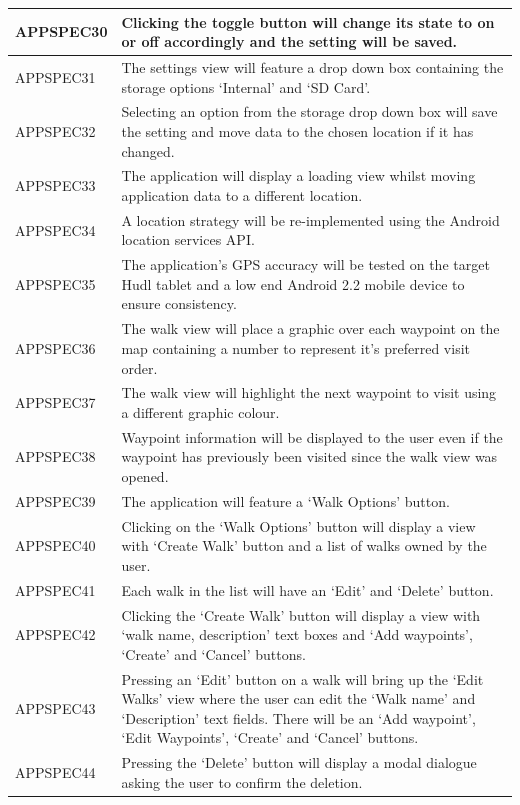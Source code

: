 \documentclass[11pt,a4paper]{article}
\begin{document}
\begin{longtable}{|p{2.5cm}p{13cm}|}
APPSPEC30 & Clicking the toggle button will change its state to on or off accordingly and the setting will be saved. \\ \hline
APPSPEC31 & The settings view will feature a drop down box containing the storage options `Internal' and `SD Card'. \\ \hline
APPSPEC32 & Selecting an option from the storage drop down box will save the setting and move data to the chosen location if it has changed. \\ \hline
APPSPEC33 & The application will display a loading view whilst moving application data to a different location. \\ \hline
APPSPEC34 & A location strategy will be re-implemented using the Android location services API. \\ \hline
APPSPEC35 & The application's GPS accuracy will be tested on the target Hudl tablet and a low end Android 2.2 mobile device to ensure consistency. \\ \hline
APPSPEC36 & The walk view will place a graphic over each waypoint on the map containing a number to represent it's preferred visit order. \\ \hline
APPSPEC37 & The walk view will highlight the next waypoint to visit using a different graphic colour. \\ \hline
APPSPEC38 & Waypoint information will be displayed to the user even if the waypoint has previously been visited since the walk view was opened. \\ \hline
APPSPEC39 & The application will feature a `Walk Options' button.\\ \hline
APPSPEC40 & Clicking on the `Walk Options' button will display a view with `Create Walk' button and a list of walks owned by the user. \\ \hline
APPSPEC41 & Each walk in the list will have an `Edit' and `Delete' button.\\ \hline
APPSPEC42 & Clicking the `Create Walk' button will display a view with `walk name, description' text boxes and `Add waypoints', `Create' and `Cancel' buttons.\\ \hline
APPSPEC43 & Pressing an `Edit' button on a walk will bring up the `Edit Walks' view where the user can edit the `Walk name' and `Description' text fields. There will be an `Add waypoint', `Edit Waypoints', `Create' and `Cancel' buttons. \\ \hline
APPSPEC44 & Pressing the `Delete' button will display a modal dialogue asking the user to confirm the deletion. \\ \hline

\end{longtable}
\end{document}
